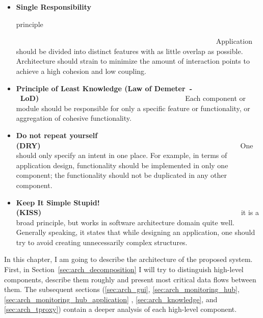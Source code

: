 \begin{itemize}

\item {\bf Single Responsibility

principle}~~~~~~~~~~~~~~~~~~~~~~~~~~~~~~~~~~~~~~~~~~~~~~~~~~~~~~~~\linebreak Application should be divided into distinct features with as little overlap as possible. Architecture should strain to minimize the amount of interaction points to achieve a high cohesion and low coupling.

\item {\bf Principle of Least Knowledge (Law of Demeter~-~LoD)}~~~~~~~~~~~~~~~~~~~~~~~~~~~~~~~~~~~~~~~~~\linebreak Each component or module should be responsible for only a specific feature or functionality, or aggregation of cohesive functionality.

\item {\bf Do not repeat yourself (DRY)}~~~~~~~~~~~~~~~~~~~~~~~~~~~~~~~~~~~~~~~~~~~~~~~~~~~~~~~~\linebreak One should only specify an intent in one place. For example, in terms of application design, functionality should be implemented in only one component; the functionality should not be duplicated in any other component.

\item {\bf Keep It Simple Stupid! (KISS)}~~~~~~~~~~~~~~~~~~~~~~~~~~~~~~~~~~~~~~~~~~~~~~~~~~~~~~~~\linebreak it is a broad principle, but works in software architecture domain quite well. Generally speaking, it states that while designing an application, one should try to avoid creating unnecessarily complex structures.
\end{itemize}

In this chapter, I am going to describe the architecture of the proposed system. First, in Section~\ref{sec:arch_decomposition} I will try to distinguish high-level components, describe them roughly and present most critical data flows between them. The subsequent sections (\ref{sec:arch_gui}, \ref{sec:arch_monitoring_hub}, \ref{sec:arch_monitoring_hub_application} , \ref{sec:arch_knowledge}, and \ref{sec:arch_tproxy}) contain a deeper analysis of each high-level component.













